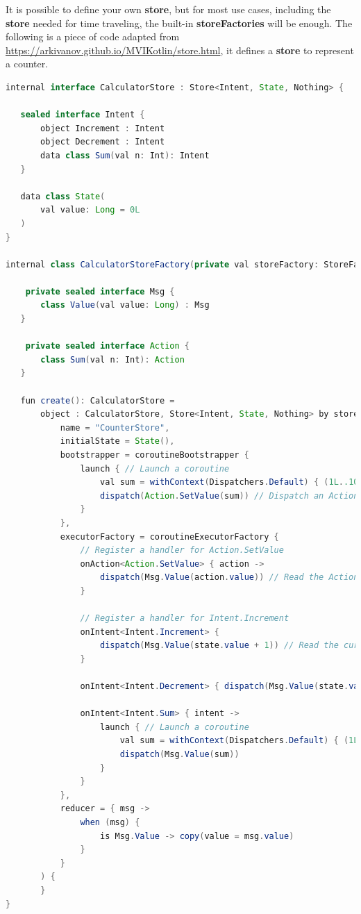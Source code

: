 It is possible to define your own \textbf{store}, but for most use cases, including the \textbf{store} needed for time traveling, the built-in \textbf{storeFactories} will be enough. The following is a piece of code adapted from \url{https://arkivanov.github.io/MVIKotlin/store.html}, it defines a \textbf{store} to represent a counter.


\begin{lstlisting}[language=java]
internal interface CalculatorStore : Store<Intent, State, Nothing> {

   sealed interface Intent {
       object Increment : Intent
       object Decrement : Intent
       data class Sum(val n: Int): Intent
   }

   data class State(
       val value: Long = 0L
   )
}

internal class CalculatorStoreFactory(private val storeFactory: StoreFactory) {

	private sealed interface Msg {
       class Value(val value: Long) : Msg
   }

	private sealed interface Action {
       class Sum(val n: Int): Action
   }

   fun create(): CalculatorStore =
       object : CalculatorStore, Store<Intent, State, Nothing> by storeFactory.create<Intent, Action, Msg, State, Nothing>(
           name = "CounterStore",
           initialState = State(),
           bootstrapper = coroutineBootstrapper {
               launch { // Launch a coroutine
                   val sum = withContext(Dispatchers.Default) { (1L..1000000.toLong()).sum() }
                   dispatch(Action.SetValue(sum)) // Dispatch an Action
               }
           },
           executorFactory = coroutineExecutorFactory {
               // Register a handler for Action.SetValue
               onAction<Action.SetValue> { action ->
                   dispatch(Msg.Value(action.value)) // Read the Action and dispatch a Message
               }

               // Register a handler for Intent.Increment
               onIntent<Intent.Increment> {
                   dispatch(Msg.Value(state.value + 1)) // Read the current state and dispatch a Message
               }

               onIntent<Intent.Decrement> { dispatch(Msg.Value(state.value - 1)) }

               onIntent<Intent.Sum> { intent ->
                   launch { // Launch a coroutine
                       val sum = withContext(Dispatchers.Default) { (1L..intent.n.toLong()).sum() }
                       dispatch(Msg.Value(sum))
                   }
               }
           },
           reducer = { msg ->
               when (msg) {
                   is Msg.Value -> copy(value = msg.value)
               }
           }
       ) {
       }
}

\end{lstlisting}

